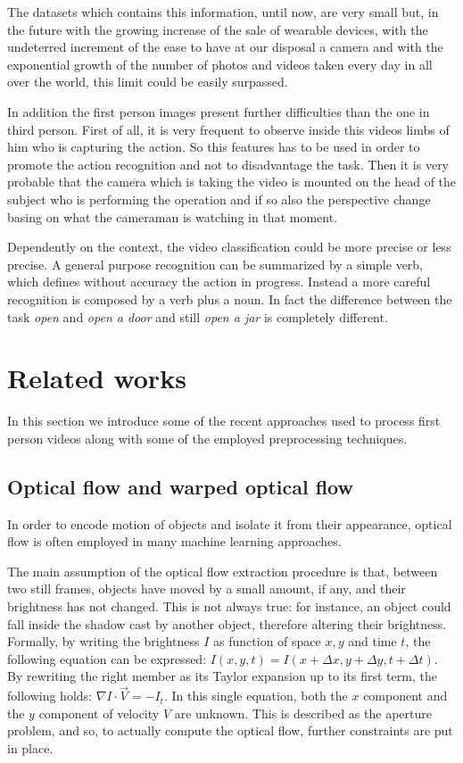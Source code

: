 \documentclass[10pt,twocolumn,letterpaper]{article}
\begin{document}
The datasets which contains this information, until now, are very small but, in the future with the growing increase of the sale of wearable devices, with the undeterred increment of the ease to have at our disposal a camera and with the exponential growth of the number of photos and videos taken every day in all over the world, this limit could be easily surpassed. 

In addition the first person images present further difficulties than the one in third person. First of all, it is very frequent to observe inside this videos limbs of him who is capturing the action. So this features has to be used in order to promote the action recognition and not to disadvantage the task. Then it is very probable that the camera which is taking the video is mounted on the head of the subject who is performing the operation and if so also the perspective change basing on what the cameraman is watching in that moment.

Dependently on the context, the video classification could be more precise or less precise. A general purpose recognition can be summarized by a simple verb, which defines without accuracy the action in progress. Instead a more careful recognition is composed by a verb plus a noun. In fact the difference between the task \emph{open} and \emph{open a door} and still \emph{open a jar} is completely different.

\section{Related works}

In this section we introduce some of the recent approaches used to process first person videos along with some of the employed preprocessing techniques.

\subsection{Optical flow and warped optical flow}

In order to encode motion of objects and isolate it from their appearance, optical flow is often employed in many machine learning approaches.

The main assumption of the optical flow extraction procedure is that, between two still frames, objects have moved by a small amount, if any, and their brightness has not changed. This is not always true: for instance, an object could fall inside the shadow cast by another object, therefore altering their brightness. Formally, by writing the brightness $I$ as function of space $x,y$ and time $t$, the following equation can be expressed:
${I(x,y,t) = I(x + \Delta x, y + \Delta y, t + \Delta t)}$. By rewriting the right member as its Taylor expansion up to its first term, the following holds: $\nabla I \cdot \vec{V} = -I_t$. In this single equation, both the $x$ component and the $y$ component of velocity $V$ are unknown. This is described as the aperture problem, and so, to actually compute the optical flow, further constraints are put in place.
\end{document}
